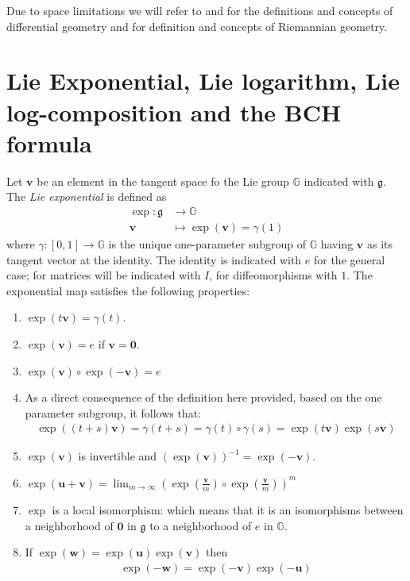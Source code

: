 Due to space limitations we will refer to \cite{do1976differential} and \cite{lee2012introduction} for the definitions and concepts of differential geometry and \cite{do1992riemannian} for definition and concepts of Riemannian geometry.

\section{Lie Exponential, Lie logarithm, Lie log-composition and the BCH formula}\label{se:lie_exp_log_comp_bch}
Let $\mathbf{v}$ be an element in the tangent space fo the Lie group $\mathbb{G}$ indicated with $\mathfrak{g}$.
The \emph{Lie exponential} is defined as 
\begin{align*}
\exp :  \mathfrak{g} & \longrightarrow  \mathbb{G}  \\
\mathbf{v} &\longmapsto  \exp(\mathbf{v} ) = \gamma(1) %
\end{align*}
where $\gamma: [0,1]\rightarrow \mathbb{G} $ is the unique one-parameter subgroup of $\mathbb{G}$ having $\mathbf{v}$ as its tangent vector at the identity. The identity is indicated with $e$ for the general case; for matrices will be indicated with $I$, for diffeomorphisms with $1$.
The exponential map satisfies the following properties:
\begin{enumerate}
	\item $\exp(t\mathbf{v}) =\gamma(t) $.
	\item $\exp(\mathbf{v}) = e$ if $\mathbf{v} = \mathbf{0}$.
	\item $\exp(\mathbf{v})\circ \exp(\mathbf{-v})  = e$
	\item As a direct consequence of the definition here provided, based on the one parameter subgroup, it follows that:
	\begin{align*}
	\exp((t+s)\mathbf{v}) = \gamma(t+s) = \gamma(t)\circ \gamma(s) = \exp(t\mathbf{v})\exp(s\mathbf{v})
	\end{align*}
	\item $\exp(\mathbf{v})$ is invertible and $(\exp(\mathbf{v}))^{-1} = \exp(-\mathbf{v})$.
		\item  $\exp(\mathbf{u} + \mathbf{v}) =\lim_{m\rightarrow \infty} (\exp(\frac{\mathbf{v}}{m}) \circ\exp(\frac{\mathbf{v}}{m}))^{m}$
	\item $\exp$ is a local isomorphism: which means that it is an isomorphisms between a neighborhood of $\mathbf{0}$ in $\mathfrak{g}$ to a neighborhood of $e$ in $\mathbb{G}$.
	\item If $\exp(\mathbf{w}) = \exp(\mathbf{u})  \exp(\mathbf{v})$ then 
	\begin{align}\label{prop:lie_inversion_property}
	\exp(\mathbf{-w}) = \exp(\mathbf{-v}) \exp(\mathbf{-u})
	\end{align}
\end{enumerate}
